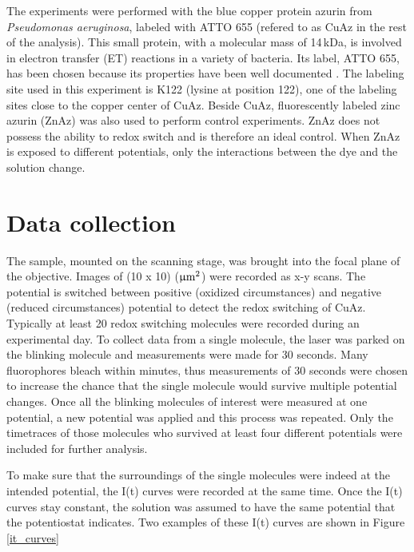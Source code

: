 \documentclass[twoside,single]{lion-msc}
\begin{document}
The experiments were performed with the blue copper protein azurin from \textit{Pseudomonas aeruginosa}, labeled with ATTO 655 (refered to as CuAz in the rest of the analysis). This small protein, with a molecular mass of 14\,kDa, is involved in electron transfer (ET) reactions in a variety of bacteria. Its label, ATTO 655, has been chosen because its properties have been well documented \cite{pvd_11}. The labeling site used in this experiment is K122 (lysine at position 122), one of the labeling sites close to the copper center of CuAz.
Beside CuAz, fluorescently labeled zinc azurin (ZnAz) was also used to perform control experiments. ZnAz does not possess the ability to redox switch and is therefore an ideal control. When ZnAz is exposed to different potentials, only the interactions between the dye and the solution change. 

\section*{Data collection} \label{data_coll}
The sample, mounted on the scanning stage, was brought into the focal plane of the objective. Images of (10 x 10) ($\upmu \textup{m}^{2}$) were recorded as x-y scans. The potential is switched between positive (oxidized circumstances) and negative (reduced circumstances) potential to detect the redox switching of CuAz. Typically at least 20 redox switching molecules were recorded during an experimental day. To collect data from a single molecule, the laser was parked on the blinking molecule and measurements were made for 30 seconds.  Many fluorophores bleach within minutes, thus measurements of 30 seconds were chosen to increase the chance that the single molecule would survive multiple potential changes. Once all the blinking molecules of interest were measured at one potential, a new potential was applied and this process was repeated. Only the timetraces of those molecules who survived at least four different potentials were included for further analysis. 

To make sure that the surroundings of the single molecules were indeed at the intended potential, the I(t) curves were recorded at the same time. Once the I(t) curves stay constant, the solution was assumed to have the same potential that the potentiostat indicates. Two examples of these I(t) curves are shown in Figure \ref{it_curves}
\end{document}
